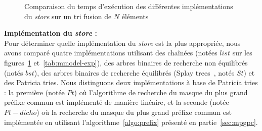 \begin{figure}[h!]
  \vspace{-.8cm}
  \caption{Comparaison du temps d'exécution des différentes implémentations du
    {\em store} sur un tri fusion de $N$ éléments
    \label{fig:mmodel-exp}}
\end{figure}




\textbf{Implémentation du {\em store} :}\\
Pour déterminer quelle implémentation du {\em store} est la plus appropriée,
nous avons comparé quatre implémentations utilisant des chaînées (notées $list$
sur les figures~\ref{fig:mmodel-exp} et~\ref{tab:mmodel-exp}), des arbres
binaires de recherche non équilibrés (notés $bst$), des arbres binaires de
recherche équilibrés (Splay trees~\cite{Sleator/85}, notés $St$) et des Patricia
tries.
Nous distinguons deux implémentations à base de Patricia tries : la première
(notée $Pt$) où l'algorithme de recherche du masque du plus grand préfixe commun
est implémenté de manière linéaire, et la seconde (notée $Pt-dicho$) où la
recherche du masque du plus grand préfixe commun est implémentée en utilisant
l'algorithme~\ref{algo:prefix} présenté en partie~\ref{sec:mpgpc}.

